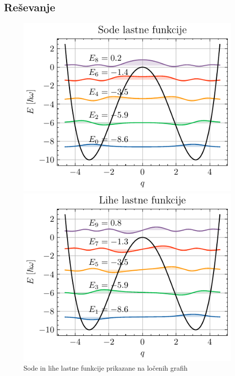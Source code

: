 \documentclass[slovene,11pt,a4paper]{article}
\begin{document}
\subsection{Reševanje}

% 


\begin{figure}[ht]
  \centering
  \begin{minipage}{0.48\textwidth}
    \centering
    \includegraphics[width=\linewidth]{graphs/dodatnasod.pdf}
    
  \end{minipage}%
  \hfill%
  \begin{minipage}{0.48\textwidth}
    \centering
    \includegraphics[width=\linewidth]{graphs/dodatnalih.pdf}
    
  \end{minipage}
  \caption{Sode in lihe lastne funkcije prikazane na ločenih grafih}
  \label{fig: dodatna}
\end{figure}
\end{document}
